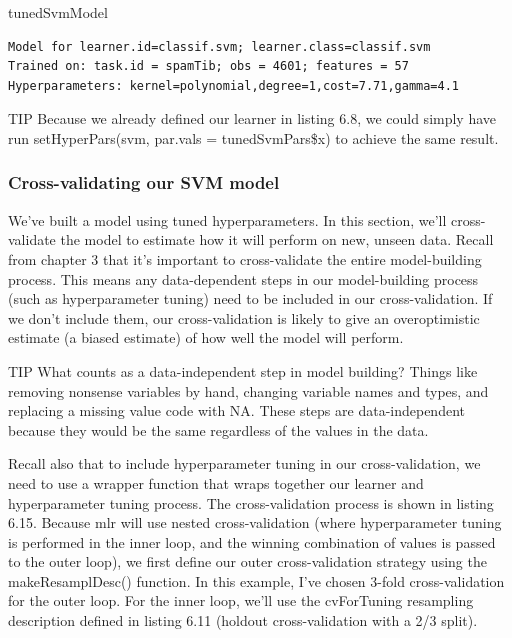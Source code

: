 \documentclass[
]{article}
\newenvironment{Shaded}{\begin{snugshade}}{\end{snugshade}}
\newcommand{\NormalTok}[1]{#1}
\begin{document}
\begin{Shaded}
\begin{Highlighting}[]
\NormalTok{tunedSvmModel}
\end{Highlighting}
\end{Shaded}

\begin{verbatim}
Model for learner.id=classif.svm; learner.class=classif.svm
Trained on: task.id = spamTib; obs = 4601; features = 57
Hyperparameters: kernel=polynomial,degree=1,cost=7.71,gamma=4.1
\end{verbatim}

TIP Because we already defined our learner in listing 6.8, we could
simply have run setHyperPars(svm, par.vals = tunedSvmPars\$x) to achieve
the same result.

\subsubsection{Cross-validating our SVM
model}\label{cross-validating-our-svm-model}

We've built a model using tuned hyperparameters. In this section, we'll
cross-validate the model to estimate how it will perform on new, unseen
data. Recall from chapter 3 that it's important to cross-validate the
entire model-building process. This means any data-dependent steps in
our model-building process (such as hyperparameter tuning) need to be
included in our cross-validation. If we don't include them, our
cross-validation is likely to give an overoptimistic estimate (a biased
estimate) of how well the model will perform.

TIP What counts as a data-independent step in model building? Things
like removing nonsense variables by hand, changing variable names and
types, and replacing a missing value code with NA. These steps are
data-independent because they would be the same regardless of the values
in the data.

Recall also that to include hyperparameter tuning in our
cross-validation, we need to use a wrapper function that wraps together
our learner and hyperparameter tuning process. The cross-validation
process is shown in listing 6.15. Because mlr will use nested
cross-validation (where hyperparameter tuning is performed in the inner
loop, and the winning combination of values is passed to the outer
loop), we first define our outer cross-validation strategy using the
makeResamplDesc() function. In this example, I've chosen 3-fold
cross-validation for the outer loop. For the inner loop, we'll use the
cvForTuning resampling description defined in listing 6.11 (holdout
cross-validation with a 2/3 split).
\end{document}

